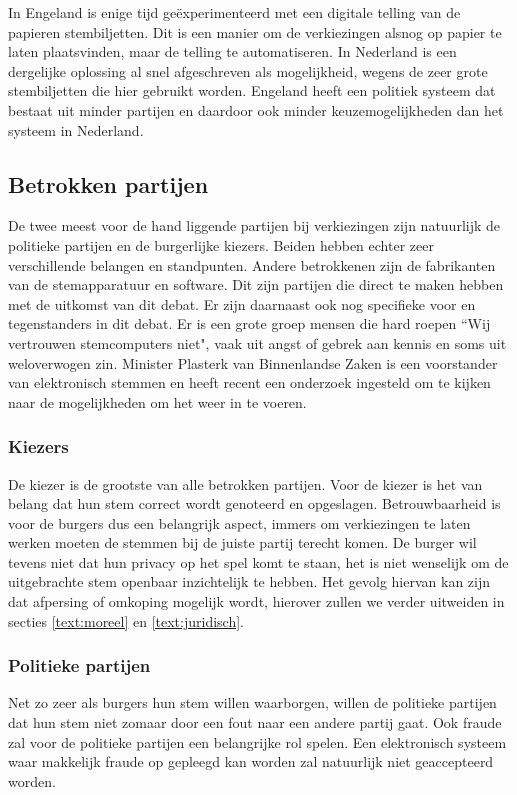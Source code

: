 \documentclass[a4paper]{article}
\begin{document}
In Engeland is enige tijd ge\"{e}xperimenteerd met een digitale telling van de papieren stembiljetten.
Dit is een manier om de verkiezingen alsnog op papier te laten plaatsvinden, maar de telling te automatiseren.
In Nederland is een dergelijke oplossing al snel afgeschreven als mogelijkheid, wegens de zeer grote stembiljetten die hier gebruikt worden. \cite{jacobs2009electronic}
Engeland heeft een politiek systeem dat bestaat uit minder partijen en daardoor ook minder keuzemogelijkheden dan het systeem in Nederland.

\subsection{Betrokken partijen}
De twee meest voor de hand liggende partijen bij verkiezingen zijn natuurlijk de politieke partijen en de burgerlijke kiezers. 
Beiden hebben echter zeer verschillende belangen en standpunten. 
Andere betrokkenen zijn de fabrikanten van de stemapparatuur en software.
Dit zijn partijen die direct te maken hebben met de uitkomst van dit debat.
Er zijn daarnaast ook nog specifieke voor en tegenstanders in dit debat.
Er is een grote groep mensen die hard roepen ``Wij vertrouwen stemcomputers niet", vaak uit angst of gebrek aan kennis en soms uit weloverwogen zin.
Minister Plasterk van Binnenlandse Zaken is een voorstander van elektronisch stemmen en heeft recent een onderzoek ingesteld om te kijken naar de mogelijkheden om het weer in te voeren.

\subsubsection{Kiezers}
De kiezer is de grootste van alle betrokken partijen.
Voor de kiezer is het van belang dat hun stem correct wordt genoteerd en opgeslagen. 
Betrouwbaarheid is voor de burgers dus een belangrijk aspect, immers om verkiezingen te laten werken moeten de stemmen bij de juiste partij terecht komen.
De burger wil tevens niet dat hun privacy op het spel komt te staan, het is niet wenselijk om de uitgebrachte stem openbaar inzichtelijk te hebben.
Het gevolg hiervan kan zijn dat afpersing of omkoping mogelijk wordt, hierover zullen we verder uitweiden in secties \ref{text:moreel} en \ref{text:juridisch}.

\subsubsection{Politieke partijen}
Net zo zeer als burgers hun stem willen waarborgen, willen de politieke partijen dat hun stem niet zomaar door een fout naar een andere partij gaat.
Ook fraude zal voor de politieke partijen een belangrijke rol spelen. 
Een elektronisch systeem waar makkelijk fraude op gepleegd kan worden zal natuurlijk niet geaccepteerd worden.
\end{document}
